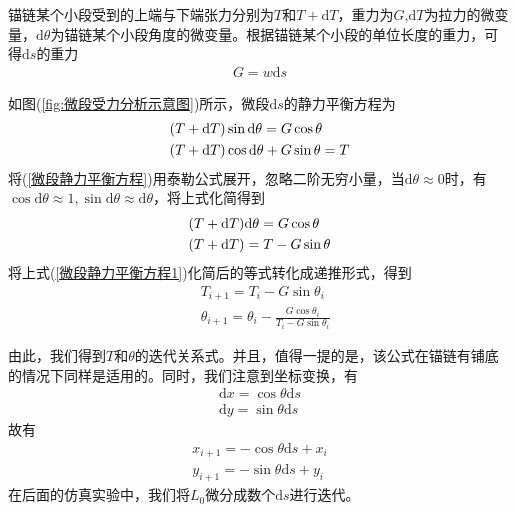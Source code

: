             \par
            锚链某个小段受到的上端与下端张力分别为$T$和$T+\mathrm{d}T$，重力为$G$,$\mathrm{d}T$为拉力的微变量，$\mathrm{d}\theta$为锚链某个小段角度的微变量。根据锚链某个小段的单位长度的重力，可得$\mathrm{d}s$的重力
            \begin{align*}
            G = w\mathrm{d}s
            \end{align*}
            \par
            如图(\ref{fig:微段受力分析示意图})所示，微段$\mathrm{d}s$的静力平衡方程为
            \begin{align}
            \label{微段静力平衡方程}
            & (T+\mathrm{d}T)\sin \mathrm{d}\theta = G\cos\theta\\
            & (T+\mathrm{d}T) \cos \mathrm{d}\theta+G\sin \theta = T\notag
            \end{align}
            将(\ref{微段静力平衡方程})用泰勒公式展开，忽略二阶无穷小量，当$\mathrm{d}\theta \approx 0$时，有$\cos \mathrm{d}\theta \approx 1,\sin \mathrm{d}\theta \approx \mathrm{d}\theta$，将上式化简得到
            \begin{align}
            \label{微段静力平衡方程1}
            & (T+\mathrm{d}T)\mathrm{d}\theta = G \cos\theta\\
            & (T+\mathrm{d}T) = T - G\sin \theta\notag
            \end{align}
            将上式(\ref{微段静力平衡方程1})化简后的等式转化成递推形式，得到
            \begin{align*}
            & T_{i+1} = T_i -G\sin \theta_i\\
            & \theta_{i+1} = \theta_i - \frac{G\cos\theta_i}{T_i - G\sin \theta_i}
            \end{align*}
            \par
            由此，我们得到$T$和$\theta$的迭代关系式。并且，值得一提的是，该公式在锚链有铺底的情况下同样是适用的。同时，我们注意到坐标变换，有
            \begin{align*}
            \mathrm{d}x = \cos \theta \mathrm{d}s\\
            \mathrm{d}y = \sin \theta \mathrm{d}s
            \end{align*}
            故有
            \begin{align*}
            x_{i+1} = -\cos\theta\mathrm{d}s+x_i\\
            y_{i+1} = -\sin\theta\mathrm{d}s+y_i
            \end{align*}
            在后面的仿真实验中，我们将$L_0$微分成数个$\mathrm{d}s$进行迭代。
